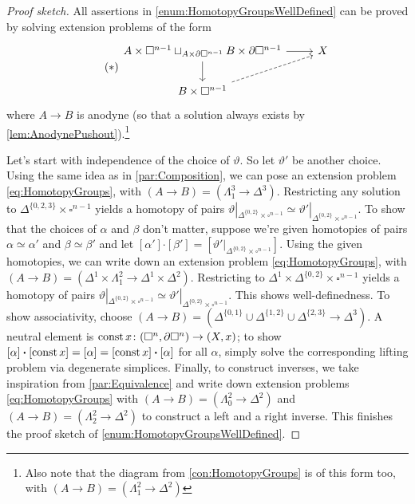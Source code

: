 \begin{proof}[Proof sketch]
	All assertions in \cref{enum:HomotopyGroupsWellDefined} can be proved by solving extension problems of the form
	\begin{equation}\label{eq:HomotopyGroups}\tag{$*$}
		\begin{tikzcd}
			A\times\square^{n-1}\sqcup_{A\times\partial\square^{n-1}}B\times\partial\square^{n-1}\dar\rar & X\\
			B\times\square^{n-1}\urar[dashed,end anchor=202]
		\end{tikzcd}
	\end{equation}
	where $A\rightarrow B$ is anodyne (so that a solution always exists by \cref{lem:AnodynePushout}).\footnote{Also note that the diagram from \cref{con:HomotopyGroups} is of this form too, with $(A\rightarrow B)=(\Lambda_1^2\rightarrow\Delta^2)$}
	
	Let's start with independence of the choice of $\vartheta$. So let $\vartheta'$ be another choice. Using the same idea as in \cref{par:Composition}, we can pose an extension problem \cref{eq:HomotopyGroups}, with $(A\rightarrow B)=(\Lambda_1^3\rightarrow \Delta^3)$. Restricting any solution to $\Delta^{\{0,2,3\}}\times \square^{n-1}$ yields a homotopy of pairs $\vartheta|_{\Delta^{\{0,2\}}\times\square^{n-1}}\simeq\vartheta'|_{\Delta^{\{0,2\}}\times\square^{n-1}}$. To show that the choices of $\alpha$ and $\beta$ don't matter, suppose we're given homotopies of pairs $\alpha\simeq\alpha'$ and $\beta\simeq\beta'$ and let $[\alpha']\mathbin{\boldsymbol{\cdot}}[\beta']=[\vartheta'|_{\Delta^{\{0,2\}}\times\square^{n-1}}]$. Using the given homotopies, we can write down an extension problem \cref{eq:HomotopyGroups}, with $(A\rightarrow B)=(\Delta^1\times\Lambda_1^2\rightarrow \Delta^1\times\Delta^2)$. Restricting to $\Delta^1\times\Delta^{\{0,2\}}\times\square^{n-1}$ yields a homotopy  of pairs $\vartheta|_{\Delta^{\{0,2\}}\times\square^{n-1}}\simeq\vartheta'|_{\Delta^{\{0,2\}}\times\square^{n-1}}$. This shows well-definedness. To show associativity, choose $(A\rightarrow B)=(\Delta^{\{0,1\}}\cup\Delta^{\{1,2\}}\cup\Delta^{\{2,3\}}\rightarrow\Delta^3)$. A neutral element is $\operatorname{const} x\colon (\square^n,\partial\square^n)\rightarrow (X,x)$; to show $[\alpha]\mathbin{\boldsymbol{\cdot}}[\operatorname{const} x]=[\alpha]=[\operatorname{const} x]\mathbin{\boldsymbol{\cdot}}[\alpha]$ for all $\alpha$, simply solve the corresponding lifting problem via degenerate simplices. Finally, to construct inverses, we take inspiration from \cref{par:Equivalence} and write down extension problems \cref{eq:HomotopyGroups} with $(A\rightarrow B)=(\Lambda_0^2\rightarrow\Delta^2)$ and $(A\rightarrow B)=(\Lambda_2^2\rightarrow\Delta^2)$ to construct a left and a right inverse. This finishes the proof sketch of \cref{enum:HomotopyGroupsWellDefined}.
	

\end{proof}
